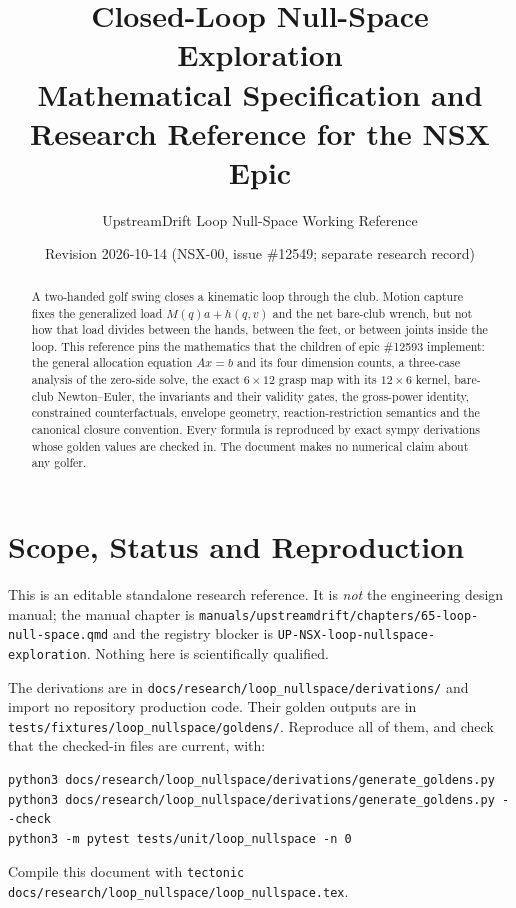 \documentclass[11pt,a4paper]{article}
\title{Closed-Loop Null-Space Exploration\\[4pt]
\large Mathematical Specification and Research Reference for the NSX Epic}
\author{UpstreamDrift Loop Null-Space Working Reference}
\date{Revision 2026-10-14 \quad (NSX-00, issue \#12549; separate research record)}
\begin{document}
\maketitle

\begin{abstract}
A two-handed golf swing closes a kinematic loop through the club.  Motion
capture fixes the generalized load $M(q)a+h(q,v)$ and the net bare-club wrench,
but not how that load divides between the hands, between the feet, or between
joints inside the loop.  This reference pins the mathematics that the children
of epic \#12593 implement: the general allocation equation $Ax=b$ and its four
dimension counts, a three-case analysis of the zero-side solve, the exact
$6\times12$ grasp map with its $12\times6$ kernel, bare-club Newton--Euler, the
invariants and their validity gates, the gross-power identity, constrained
counterfactuals, envelope geometry, reaction-restriction semantics and the
canonical closure convention.  Every formula is reproduced by exact sympy
derivations whose golden values are checked in.  The document makes no
numerical claim about any golfer.
\end{abstract}

\tableofcontents

\section{Scope, Status and Reproduction}
\label{sec:scope}

This is an editable standalone research reference.  It is \emph{not} the
engineering design manual; the manual chapter is
\texttt{manuals/upstreamdrift/chapters/65-loop-null-space.qmd} and the registry
blocker is \texttt{UP-NSX-loop-nullspace-exploration}.  Nothing here is
scientifically qualified.

The derivations are in \texttt{docs/research/loop\_nullspace/derivations/} and
import no repository production code.  Their golden outputs are in
\texttt{tests/fixtures/loop\_nullspace/goldens/}.  Reproduce all of them, and
check that the checked-in files are current, with:
\begin{verbatim}
python3 docs/research/loop_nullspace/derivations/generate_goldens.py
python3 docs/research/loop_nullspace/derivations/generate_goldens.py --check
python3 -m pytest tests/unit/loop_nullspace -n 0
\end{verbatim}
Compile this document with
\texttt{tectonic docs/research/loop\_nullspace/loop\_nullspace.tex}.
\end{document}
